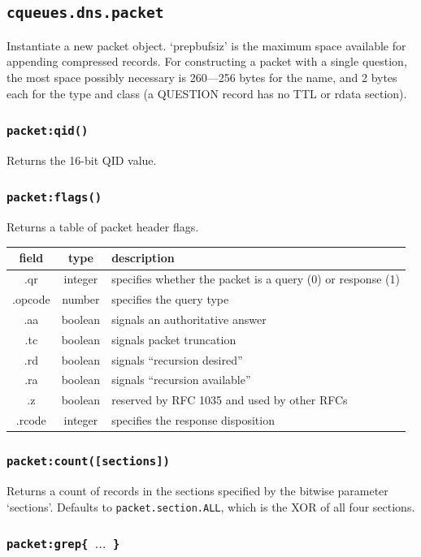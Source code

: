 \documentclass[11pt, oneside]{memoir}
\newcommand*{\fn}[1]{\texttt{#1}\xspace}
\newcounter{toccols}
\newenvironment{Module}[1]{
	\subsection{\texttt{#1}}
	\addtocontents{toc}{
		\protect\begin{multicols}{\value{toccols}}
	}
}{
	\addtocontents{toc}{\protect\end{multicols}}
}
\begin{document}
\begin{Module}{cqueues.dns.packet}
Instantiate a new packet object. `prepbufsiz' is the maximum space available for appending compressed records. For constructing a packet with a single question, the most space possibly necessary is 260---256 bytes for the name, and 2 bytes each for the type and class (a QUESTION record has no TTL or rdata section).

\subsubsection[\fn{packet:qid}]{\fn{packet:qid()}}

Returns the 16-bit QID value.

\subsubsection[\fn{packet:flags}]{\fn{packet:flags()}}

Returns a table of packet header flags.

\begin{tabular}{ c | c | l }
field & type & description\\\hline
.qr & integer & specifies whether the packet is a query (0) or response (1)\\
.opcode & number & specifies the query type\\
.aa & boolean & signals an authoritative answer\\
.tc & boolean & signals packet truncation\\
.rd & boolean & signals ``recursion desired''\\
.ra & boolean & signals ``recursion available''\\
.z & boolean & reserved by RFC 1035 and used by other RFCs\\
.rcode & integer & specifies the response disposition
\end{tabular}

\subsubsection[\fn{packet:count}]{\fn{packet:count([sections])}}

Returns a count of records in the sections specified by the bitwise parameter `sections'. Defaults to \texttt{packet.section.ALL}, which is the XOR of all four sections.

\subsubsection[\fn{packet:grep}]{\fn{packet:grep\{ $\ldots$ \}}}


\end{Module}
\end{document}
